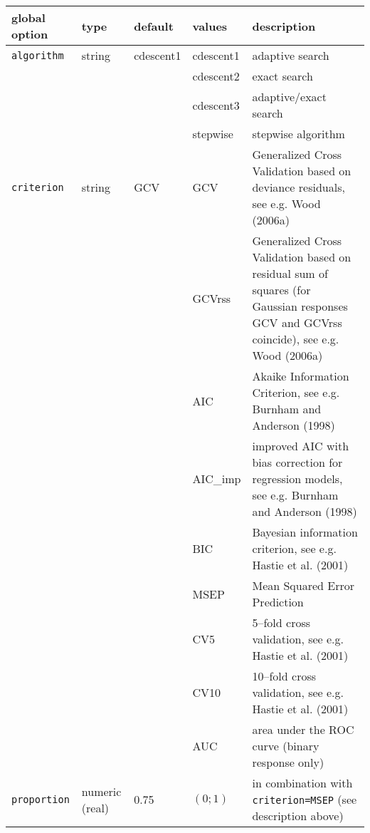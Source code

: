 \begin{table}[ht] \footnotesize
\begin{center}
\begin{tabular}{|p{2.2cm}|p{1.3cm}|p{1.5cm}|p{1.6cm}|p{7.4cm}|}
\hline
{\bf global option} & {\bf type} & {\bf default} & {\bf values} & {\bf description} \\
\hline \hline
{\tt algorithm}  & string  & cdescent1 & cdescent1 & adaptive search \\
                 &         &           & cdescent2 & exact search \\
                 &         &           & cdescent3 & adaptive/exact search \\
                 &         &           & stepwise  & stepwise algorithm \\
\hline
{\tt criterion}  & string  & GCV       & GCV      & Generalized Cross Validation based on deviance residuals, see e.g. Wood (2006a) \\
                 &         &           & GCVrss   & Generalized Cross Validation based on residual sum of squares
                                                    (for Gaussian responses GCV and GCVrss coincide), see e.g. Wood (2006a) \\
                 &         &           & AIC      & Akaike Information Criterion, see e.g. Burnham and Anderson (1998) \\
                 &         &           & AIC\_imp & improved AIC with bias correction for regression models, see e.g. Burnham and Anderson (1998) \\
                 &         &           & BIC      & Bayesian information criterion, see e.g. Hastie et al. (2001)  \\
                 &         &           & MSEP     & Mean Squared Error Prediction \\
                 &         &           & CV5      & 5--fold cross validation, see e.g. Hastie et al. (2001)\\
                 &         &           & CV10     & 10--fold cross validation, see e.g. Hastie et al. (2001) \\
                 &         &           & AUC      & area under the ROC curve
                                                    (binary response only) \\
\hline
{\tt proportion} & numeric \newline (real)    & 0.75 & $(0;1)$ & in combination with {\tt criterion=MSEP}  (see description above) \\

\end{tabular}
\end{center}
\end{table}
